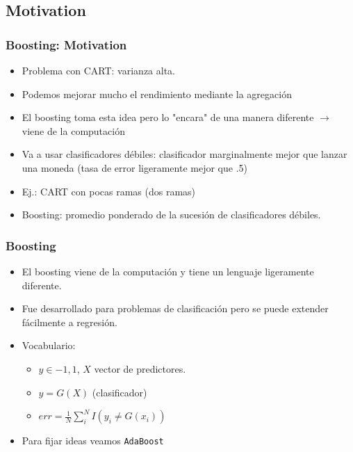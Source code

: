 \documentclass[
  shownotes,
  xcolor={svgnames},
  hyperref={colorlinks,citecolor=DarkBlue,linkcolor=DarkRed,urlcolor=DarkBlue}
  , aspectratio=169]{beamer}
\begin{document}
\subsection{Motivation}
\begin{frame}[fragile]
\frametitle{Boosting: Motivation}

\begin{itemize}
  \item Problema con CART: varianza alta.
  \medskip
   \item Podemos mejorar mucho el rendimiento mediante la agregación 
   \medskip 
   \item El boosting toma esta idea pero lo "encara" de una manera diferente $\rightarrow$ viene de la computación
   \medskip
   \item Va a usar clasificadores débiles: clasificador marginalmente mejor que lanzar una moneda (tasa de error ligeramente mejor que .5) 
\medskip
\item Ej.: CART con pocas ramas (dos ramas) 
\medskip
\item Boosting: promedio ponderado de la sucesión de clasificadores débiles.

\end{itemize}
\end{frame}
\begin{frame}[fragile]
\frametitle{Boosting}

\begin{itemize}
  \item El boosting viene de la computación y tiene un lenguaje ligeramente diferente.
  \medskip
  \item Fue desarrollado para problemas de clasificación pero se puede extender fácilmente a regresión.
\medskip
\item Vocabulario:
\medskip
  \begin{itemize}
  \item $y \in {-1,1}$, $X$ vector de predictores.
  \medskip
  \item $y = G (X)$ (clasificador)
  \medskip
  \item $err = \frac{1}{N} \sum_{i}^N I(y_i\neq G(x_i))$
  \end{itemize}
  \medskip
  \item Para fijar ideas veamos \texttt{AdaBoost}
\end{itemize}


\end{frame}
\end{document}
